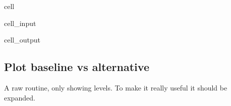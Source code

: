 \documentclass[letterpaper,10pt,english]{jupyterBook}
\begin{document}
\begin{sphinxuseclass}{cell}\begin{sphinxVerbatimInput}

\begin{sphinxuseclass}{cell_input}
\begin{sphinxVerbatim}[commandchars=\\\{\}]
  
    \PYG{p}{[}\PYG{p}{]}  
    \PYG{p}{[}\PYG{p}{]}  
\end{sphinxVerbatim}

\end{sphinxuseclass}\end{sphinxVerbatimInput}
\begin{sphinxVerbatimOutput}

\begin{sphinxuseclass}{cell_output}
\noindent{}

\noindent{}

\end{sphinxuseclass}\end{sphinxVerbatimOutput}

\end{sphinxuseclass}

\subsection{Plot baseline vs alternative}
\label{\detokenize{content/Python/modelflow_features:plot-baseline-vs-alternative}}
\sphinxAtStartPar
A raw routine, only showing levels.
To make it really useful it should be expanded.
\end{document}

